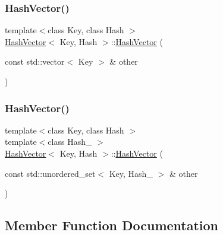 \mbox{\label{class_hash_vector_a8f4c8d505e5cedfe24463ccf267ec5f9}} 
\subsubsection{\texorpdfstring{Hash\+Vector()}{HashVector()}\hspace{0.1cm}{\footnotesize\ttfamily [2/3]}}
{\footnotesize\ttfamily template$<$class Key, class Hash $>$ \\
\mbox{\hyperlink{class_hash_vector}{Hash\+Vector}}$<$ Key, Hash $>$\+::\mbox{\hyperlink{class_hash_vector}{Hash\+Vector}} (\begin{DoxyParamCaption}\item[{const std\+::vector$<$ Key $>$ \&}]{other }\end{DoxyParamCaption})\hspace{0.3cm}{\ttfamily [explicit]}}

\mbox{\label{class_hash_vector_a673094903c45ef33c87f54cb5391210f}} 
\subsubsection{\texorpdfstring{Hash\+Vector()}{HashVector()}\hspace{0.1cm}{\footnotesize\ttfamily [3/3]}}
{\footnotesize\ttfamily template$<$class Key, class Hash $>$ \\
template$<$class Hash\+\_ $>$ \\
\mbox{\hyperlink{class_hash_vector}{Hash\+Vector}}$<$ Key, Hash $>$\+::\mbox{\hyperlink{class_hash_vector}{Hash\+Vector}} (\begin{DoxyParamCaption}\item[{const std\+::unordered\+\_\+set$<$ Key, Hash\+\_\+2 $>$ \&}]{other }\end{DoxyParamCaption})\hspace{0.3cm}{\ttfamily [explicit]}}



\subsection{Member Function Documentation}
\mbox{\label{class_hash_vector_a24ee21cdb0db0bd29b86c7649eaa6b5e}} 
